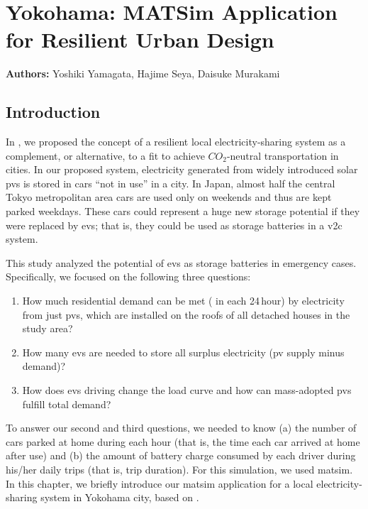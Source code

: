 \chapter{Yokohama: MATSim Application for Resilient Urban Design}
\label{ch:yokohama}
\hfill \textbf{Authors:} Yoshiki Yamagata, Hajime Seya, Daisuke Murakami

\section{Introduction}
In \citet[][]{YamagataSeya_ITSIET_2015}, we proposed the concept of a resilient local electricity-sharing system as a complement, or alternative, to a \gls{fit} to achieve $CO_2$-neutral transportation in cities. In our proposed system, electricity generated from widely introduced solar \glspl{pv}
is stored in cars ``not in use'' in a city. In Japan, almost half the central Tokyo metropolitan area cars are used only on weekends and thus are kept parked weekdays. These cars could represent a huge new storage potential if they were replaced by \glspl{ev}; that is, they could be used as storage batteries in a \gls{v2c} system. 

This study analyzed the potential of \glspl{ev} as storage batteries in emergency cases. Specifically, we focused on the following three questions: 
\begin{enumerate}\styleEnumerate
\item How much residential demand can be met ( in each 24\,hour) by electricity from just \glspl{pv}, which are installed on the roofs of all detached houses in the study area? 
\item How many \glspl{ev} are needed to store all surplus electricity (\gls{pv} supply minus demand)?
\item How does \glspl{ev} driving change the load curve and how can mass-adopted \glspl{pv} fulfill total demand? 
\end{enumerate}
To answer our second and third questions, we needed to know (a) the number of cars parked at home during each hour (that is, the time each car arrived at home after use) and (b) the amount of battery charge consumed by each driver during his/her daily trips (that is, trip duration). For this simulation, we used \gls{matsim}. In this chapter, we briefly introduce our \gls{matsim} application for a local electricity-sharing system in Yokohama city, based on \citet[][]{YamagataSeya_ApE_2013, YamagataEtAl_EnPro_2014, YamagataEtAl_ICAE_2015}.


